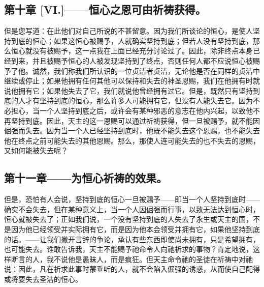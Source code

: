 
\subsection{第十章 [VI.]——恒心之恩可由祈祷获得。}

但是您写道：在此他们对自己所说的不甚留意。因为我们所谈论的恒心，是使人坚持到底的恒心；如果这恒心被赐予，人就确实坚持到底；但若人没有坚持到底，那么恒心就没有被赐予，这一点我在上面已经充分讨论过了。因此，除非终点本身已经到来，并且被赐予恒心的人被发现坚持到了终点，否则任何人都不应说恒心被赐予了他。诚然，我们称我们所认识的一位贞洁者贞洁，无论他是否在同样的贞洁中继续或停止；如果他拥有任何其他可以保持和失去的神圣恩赐，我们在他拥有时就说他拥有它；如果他失去了它，我们就说他曾经拥有过它。但是，既然只有坚持到底的人才有坚持到底的恒心，那么许多人可能拥有它，但没有人能失去它。因为不必担心，当一个人坚持到底之后，或许会有某种邪恶的意志在他内兴起，以致他不再坚持到底。因此，天主的这一恩赐可以通过祈祷获得，但一旦被赐予，就不能因倔强而失去。因为当一个人已经坚持到底时，他既不能失去这个恩赐，也不能失去他在终点之前可能失去的其他恩赐。那么，那使人连可能失去的也不失去的恩赐，又如何能被失去呢？\par


\subsection{第十一章——为恒心祈祷的效果。}

但是，恐怕有人会说，坚持到底的恒心一旦被赐予——即当一个人坚持到底时——确实不会失去，但在某种意义上，当一个人因倔强而行事，以致无法达到恒心时，恒心就被失去了；正如我们说，一个没有坚持到底的人失去了永生或天主的国，不是因为他已经领受并实际拥有它，而是因为他本会领受并拥有它，如果他坚持到底的话。——让我们撇开言辞的争论，承认有些东西即使尚未拥有，只是希望拥有，也可能失去。谁敢告诉我，天主不能赐予祂命令人向祂祈求的事物？肯定地说，这样断言的人，我不说他是愚昧人，而是疯狂。但天主命令祂的圣徒在祈祷中对祂说：因此，凡在祈求此事时蒙垂听的人，就不会陷入倔强的诱惑，从而使自己配得或将要失去圣洁的恒心。\par


